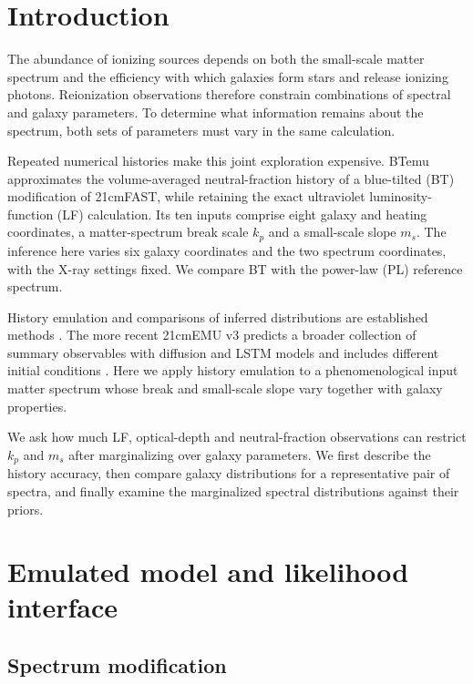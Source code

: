 \section{Introduction}\label{introduction}

The abundance of ionizing sources depends on both the small-scale matter spectrum and the efficiency with which galaxies form stars and release ionizing photons. Reionization observations therefore constrain combinations of spectral and galaxy parameters. To determine what information remains about the spectrum, both sets of parameters must vary in the same calculation.

Repeated numerical histories make this joint exploration expensive. BTemu approximates the volume-averaged neutral-fraction history of a blue-tilted (BT) modification of 21cmFAST, while retaining the exact ultraviolet luminosity-function (LF) calculation. Its ten inputs comprise eight galaxy and heating coordinates, a matter-spectrum break scale $k_p$ and a small-scale slope $m_s$. The inference here varies six galaxy coordinates and the two spectrum coordinates, with the X-ray settings fixed. We compare BT with the power-law (PL) reference spectrum.

History emulation and comparisons of inferred distributions are established methods \cite{Breitman2024}. The more recent 21cmEMU v3 predicts a broader collection of summary observables with diffusion and LSTM models and includes different initial conditions \cite{Breitman2026}. Here we apply history emulation to a phenomenological input matter spectrum whose break and small-scale slope vary together with galaxy properties.

We ask how much LF, optical-depth and neutral-fraction observations can restrict $k_p$ and $m_s$ after marginalizing over galaxy parameters. We first describe the history accuracy, then compare galaxy distributions for a representative pair of spectra, and finally examine the marginalized spectral distributions against their priors.

\section{Emulated model and likelihood interface}\label{physical-model-and-simulations}

\subsection{Spectrum modification}\label{spectrum-modification}

